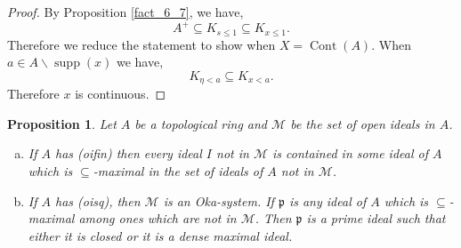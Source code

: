\documentclass[8pt]{article}
\numberwithin{equation}{section}
\newtheorem{proposition}{Proposition}[subsection]
\DeclareMathOperator{\supp}{supp}
\DeclareMathOperator{\Spv}{Spv}
\DeclareMathOperator{\Cont}{Cont}
\newcommand{\p}[0]{\mathfrak{p}}
\begin{document}
\begin{proof}
    By Proposition \ref{fact_6_7}, we have,
    \begin{equation*}
    A^+\subseteq K_{s\leq 1}\subseteq K_{x\leq 1}.
    \end{equation*}
    Therefore we reduce the statement to show when $X=\Cont(A)$. When $a\in A\backslash \supp(x) $ we have,
    \begin{equation*}
    K_{\eta<a}\subseteq K_{x<a}.
    \end{equation*}
    Therefore $x$ is continuous. 
\end{proof}

\begin{proposition}
\label{proposition_15_5}
Let $A$ be a topological ring and $\mathcal{M}$ be the set of open ideals in $A$.
\begin{enumerate}[a.]
    \item If $A$ has (oifin) then every ideal $I$ not in $\mathcal{M}$ is contained in some ideal of $A$ which is $\subseteq$-maximal in the set of ideals of $A$ not in $\mathcal{M}$.
    \item If $A$ has (oisq), then $\mathcal{M}$ is an Oka-system. If $\p$ is any ideal of $A$ which is $\subseteq$-maximal among ones which are not in $\mathcal{M}$. Then $\p$ is a prime ideal such that either it is closed or it is a dense maximal ideal.%
\end{enumerate}
\end{proposition}
\end{document}
